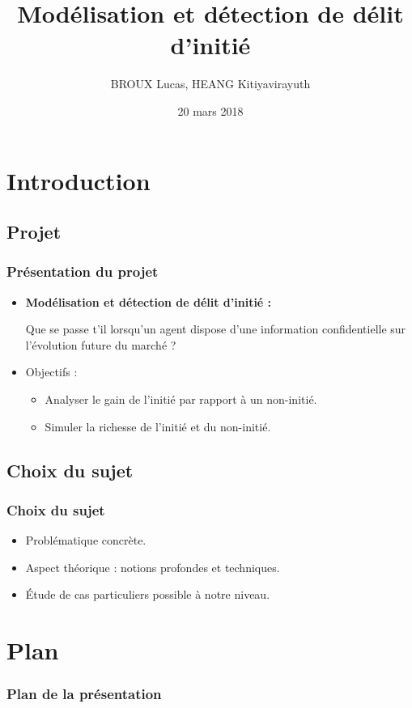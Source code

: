 \documentclass{beamer}
\title{Modélisation et détection de délit d'initié}
\author{BROUX Lucas, HEANG Kitiyavirayuth}
\date{20 mars 2018}
\begin{document}
\begin{frame}
\titlepage
\end{frame}

\section*{Introduction}
\subsection*{Projet}
\begin{frame}
\frametitle{Présentation du projet}
\begin{itemize}
\item \textbf{Modélisation et détection de délit d'initié :}
\par Que se passe t'il lorsqu'un agent dispose d'une information confidentielle sur l'évolution future du marché ?
\item Objectifs :
	\begin{itemize}
	\item Analyser le gain de l'initié par rapport à un non-initié.
	\item Simuler la richesse de l'initié et du non-initié.
	\end{itemize}
\end{itemize}
\end{frame}

\subsection*{Choix du sujet}
\begin{frame}
\frametitle{Choix du sujet}
\begin{itemize}
\item Problématique concrète.
\item Aspect théorique : notions profondes et techniques.
\item Étude de cas particuliers possible à notre niveau.
\end{itemize}
\end{frame}

\section*{Plan}
\begin{frame}
\frametitle{Plan de la présentation}
\tableofcontents
\end{frame}

\end{document}
